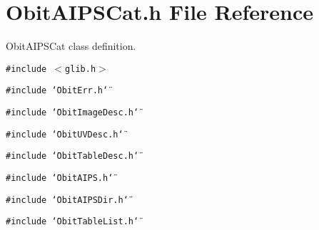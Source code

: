 \section{Obit\-AIPSCat.h File Reference}
\label{ObitAIPSCat_8h}
Obit\-AIPSCat class definition. 

{\tt \#include $<$glib.h$>$}\par
{\tt \#include \char`\"{}Obit\-Err.h\char`\"{}}\par
{\tt \#include \char`\"{}Obit\-Image\-Desc.h\char`\"{}}\par
{\tt \#include \char`\"{}Obit\-UVDesc.h\char`\"{}}\par
{\tt \#include \char`\"{}Obit\-Table\-Desc.h\char`\"{}}\par
{\tt \#include \char`\"{}Obit\-AIPS.h\char`\"{}}\par
{\tt \#include \char`\"{}Obit\-AIPSDir.h\char`\"{}}\par
{\tt \#include \char`\"{}Obit\-Table\-List.h\char`\"{}}\par
